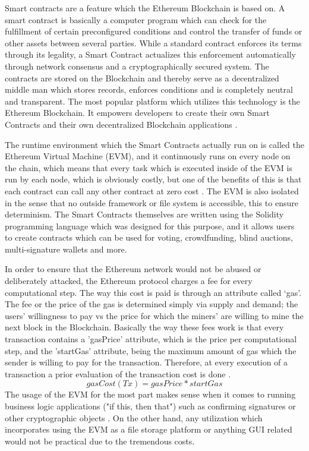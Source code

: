 Smart contracts are a feature which the Ethereum Blockchain is based on. A smart contract is basically a computer program which can check for the fulfillment of certain preconfigured conditions and control the transfer of funds or other assets between several parties. While a standard contract enforces its terms through its legality, a Smart Contract actualizes this enforcement automatically through network consensus and a cryptographically secured system. The contracts are stored on the Blockchain and thereby serve as a decentralized middle man which stores records, enforces conditions and is completely neutral and transparent. The most popular platform which utilizes this technology is the Ethereum Blockchain. It empowers developers to create their own Smart Contracts and their own decentralized Blockchain applications \cite{relatedWork38}.

The runtime environment which the Smart Contracts actually run on is called the Ethereum Virtual Machine (EVM), and it continuously runs on every node on the chain, which means that every task which is executed inside of the EVM is run by each node, which is obviously costly, but one of the benefits of this is that each contract can call any other contract at zero cost \cite{relatedWork38}. The EVM is also isolated in the sense that no outside framework or file system is accessible, this to ensure determinism. The Smart Contracts themselves are written using the Solidity programming language which was designed for this purpose, and it allows users to create contracts which can be used for voting, crowdfunding, blind auctions, multi-signature wallets and more.

In order to ensure that the Ethereum network would not be abused or deliberately attacked, the Ethereum protocol charges a fee for every computational step. The way this cost is paid is through an attribute called ‘gas’. The fee or the price of the gas is determined simply via supply and demand; the users’ willingness to pay vs the price for which the miners' are willing to mine the next block in the Blockchain. Basically the way these fees work is that every transaction contains a 'gasPrice' attribute, which is the price per computational step, and the 'startGas' attribute, being the maximum amount of gas which the sender is willing to pay for the transaction. Therefore, at every execution of a transaction a prior evaluation of the transaction cost is done \cite{relatedWork38}.
				$$ gasCost(Tx)= {gasPrice * startGas}$$
The usage of the EVM for the most part makes sense when it comes to running business logic applications ("if this, then that") such as confirming signatures or other cryptographic objects \cite{relatedWork39}. On the other hand, any utilization which incorporates using the EVM as a file storage platform or anything GUI related would not be practical due to the tremendous costs.

